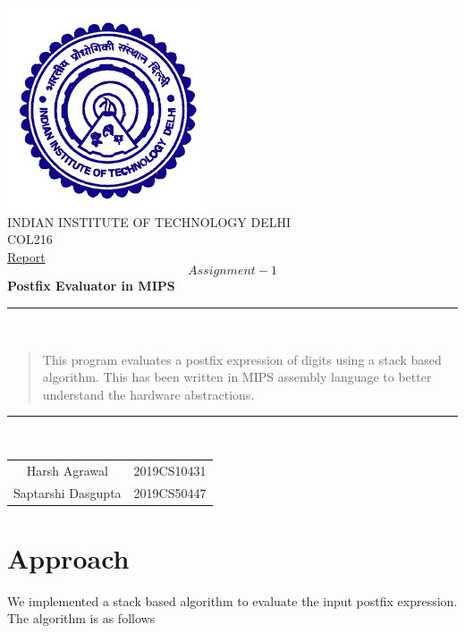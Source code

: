 \documentclass[hidelinks,12pt]{article}
\begin{document}
\begin{titlepage}
    \centering
    \includegraphics[scale=0.5]{../../logo.png}\\[1.0cm]
    \Large INDIAN INSTITUTE OF TECHNOLOGY DELHI\\[1.0 cm]
    \LARGE COL216\\[0.1cm]
    \Large \underline{Report}\\
    \large \[Assignment-1\]
    \LARGE \textbf{Postfix Evaluator in MIPS}
    

    \rule{\textwidth}{0.2 mm} \\[0.1cm]
    \begin{abstract}
        This program evaluates a postfix expression of digits using a stack based algorithm.
        This has been written in MIPS assembly language to better understand the hardware abstractions.
                \\[0.1cm]    
    \end{abstract}
    \rule{\textwidth}{0.2 mm} \\[0.1cm]
    \begin{flushright}
        
        \begin{tabular}{c c}
            \small {Harsh Agrawal} & \small {2019CS10431} \\
            \small {Saptarshi Dasgupta} & \small {2019CS50447} \\
        \end{tabular}
    \end{flushright}
\end{titlepage}
\tableofcontents
\newpage

\section{Approach}
We implemented a stack based algorithm to evaluate the input postfix expression. The algorithm is as follows
\end{document}
